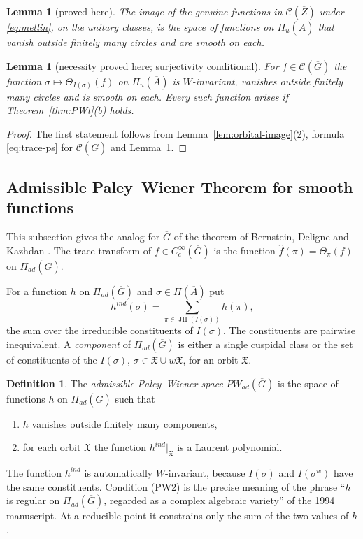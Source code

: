 \documentclass[12pt,letterpaper]{article}
\numberwithin{equation}{section}
\newtheorem{lemma}[theorem]{Lemma}
\theoremstyle{definition}
\newtheorem{xdefinition}[theorem]{Definition}
\newcommand{\proved}{proved here}
\newcommand{\cond}{conditional}
\newcommand{\bG}{\overline{G}}
\newcommand{\bA}{\overline{A}}
\newcommand{\bZ}{\overline{Z}}
\newcommand{\calC}{\mathcal C}
\newcommand{\fX}{\mathfrak X}
\DeclareMathOperator{\JH}{JH}
\newcommand{\Pia}{\Pi_{ad}(\bG)}
\begin{document}
\begin{lemma}[\proved]\label{lem:SPW-Z}
The image of the genuine functions in $\calC(\bZ)$ under \eqref{eq:mellin}, on the unitary
classes, is the space of functions on $\Pi_u(\bA)$ that vanish outside finitely many
circles and are smooth on each.
\end{lemma}

\begin{lemma}[necessity \proved; surjectivity \cond]\label{lem:SPWps}
For $f\in\calC(\bG)$ the function $\sigma\mapsto\Theta_{I(\sigma)}(f)$ on $\Pi_u(\bA)$ is
$W$-invariant, vanishes outside finitely many circles and is smooth on each.  Every such
function arises if Theorem~\ref{thm:PWt}(b) holds.
\end{lemma}
\begin{proof}
The first statement follows from Lemma~\ref{lem:orbital-image}(2), formula
\eqref{eq:trace-ps} for $\calC(\bG)$ and Lemma~\ref{lem:SPW-Z}.
\end{proof}

\subsection{Admissible Paley--Wiener Theorem for smooth functions}\label{subsec:PWad}

This subsection gives the analog for $\bG$ of the theorem of Bernstein, Deligne and
Kazhdan \cite{BDK86}.  The trace transform of $f\in C_c^\infty(\bG)$ is the function
$\hat f(\pi)=\Theta_\pi(f)$ on $\Pia$.

For a function $h$ on $\Pia$ and $\sigma\in\Pi(\bA)$ put
\[
h^{ind}(\sigma)=\sum_{\pi\in\JH(I(\sigma))}h(\pi),
\]
the sum over the irreducible constituents of $I(\sigma)$.  The constituents are pairwise
inequivalent.  A \emph{component} of $\Pia$ is either a single cuspidal class or the set of
constituents of the $I(\sigma)$, $\sigma\in\fX\cup w\fX$, for an orbit $\fX$.

\begin{xdefinition}\label{def:PWad}
The \emph{admissible Paley--Wiener space} $PW_{ad}(\bG)$ is the space of functions $h$ on
$\Pia$ such that
\begin{enumerate}[label=(PW\arabic*),leftmargin=*,itemsep=1pt]
\item $h$ vanishes outside finitely many components,
\item for each orbit $\fX$ the function $h^{ind}|_{\fX}$ is a Laurent polynomial.
\end{enumerate}
\end{xdefinition}
The function $h^{ind}$ is automatically $W$-invariant, because $I(\sigma)$ and $I(\sigma^w)$
have the same constituents.  Condition (PW2) is the precise meaning of the phrase
``$h$ is regular on $\Pia$, regarded as a complex algebraic variety'' of the 1994
manuscript.  At a reducible point it constrains only the sum of the two values of $h$.
\end{document}
